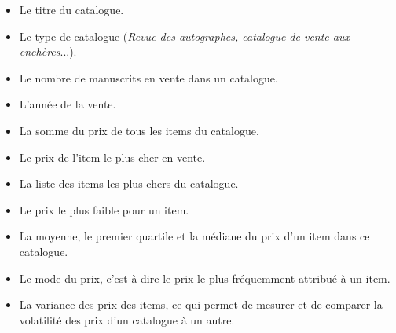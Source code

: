 \begin{itemize}
	\item Le titre du catalogue.
	\item Le type de catalogue (\textit{Revue des autographes, catalogue de vente aux enchères}...).
	\item Le nombre de manuscrits en vente dans un catalogue.
	\item L'année de la vente.
	\item La somme du prix de tous les items du catalogue.
	\item Le prix de l'item le plus cher en vente.
	\item La liste des items les plus chers du catalogue.
	\item Le prix le plus faible pour un item.
	\item La moyenne, le premier quartile et la médiane du prix d'un item dans ce catalogue.
	\item Le mode du prix, c'est-à-dire le prix le plus fréquemment attribué à un item.
	\item La variance des prix des items, ce qui permet de mesurer et de comparer la volatilité des prix d'un catalogue à un autre.
\end{itemize}


